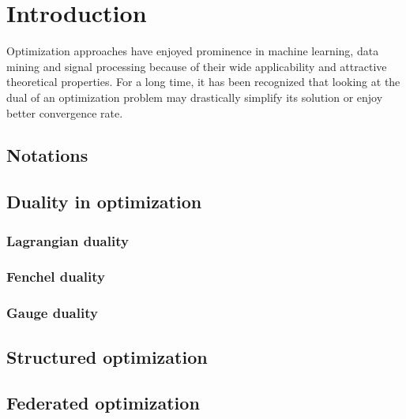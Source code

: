 
\chapter{Introduction}
\label{ch:Introduction}

Optimization approaches have enjoyed prominence in machine learning, data mining and signal processing because of their wide applicability and attractive theoretical properties. For a
long time, it has been recognized that looking at the dual of an optimization problem may drastically simplify its solution or enjoy better convergence rate. 

\section{Notations}

\section{Duality in optimization}

\subsection{Lagrangian duality}

\subsection{Fenchel duality}

\subsection{Gauge duality}

\section{Structured optimization}

\section{Federated optimization}
